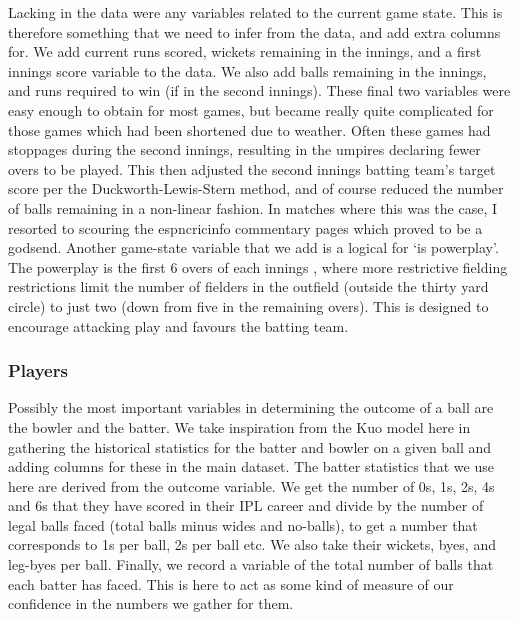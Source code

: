 Lacking in the data were any variables related to the current game state. This is therefore something that we need to infer from the data, and add extra columns for. We add current runs scored, wickets remaining in the innings, and a first innings score variable to the data. We also add balls remaining in the innings, and runs required to win (if in the second innings). These final two variables were easy enough to obtain for most games, but became really quite complicated for those games which had been shortened due to weather. Often these games had stoppages during the second innings, resulting in the umpires declaring fewer overs to be played. This then adjusted the second innings batting team’s target score per the Duckworth-Lewis-Stern method, and of course reduced the number of balls remaining in a non-linear fashion. In matches where this was the case, I resorted to scouring the espncricinfo commentary pages \cite{noauthor_live_nodate} which proved to be a godsend. Another game-state variable that we add is a logical for ‘is powerplay’. The powerplay is the first 6 overs of each innings \footnotemark{}, where more restrictive fielding restrictions limit the number of fielders in the outfield (outside the thirty yard circle) to just two (down from five in the remaining overs). This is designed to encourage attacking play and favours the batting team.


\subsubsection{Players}

Possibly the most important variables in determining the outcome of a ball are the bowler and the batter. We take inspiration from the Kuo model here in gathering the historical statistics for the batter and bowler on a given ball and adding columns for these in the main dataset. The batter statistics that we use here are derived from the outcome variable. We get the number of 0s, 1s, 2s, 4s and 6s\footnotemark{} that they have scored in their IPL career and divide by the number of legal balls faced (total balls minus wides and no-balls), to get a number that corresponds to 1s per ball, 2s per ball etc. We also take their wickets, byes, and leg-byes per ball. Finally, we record a variable of the total number of balls that each batter has faced. This is here to act as some kind of measure of our confidence in the numbers we gather for them.

